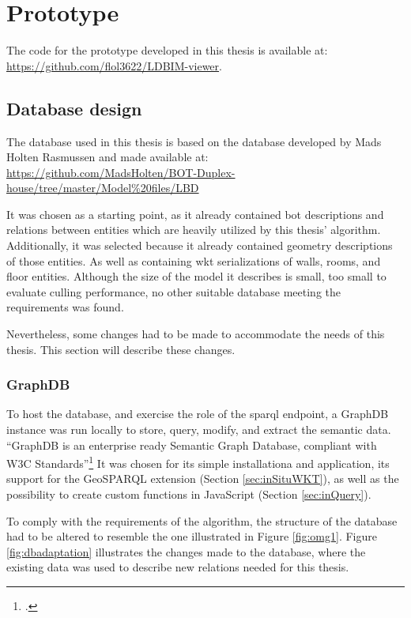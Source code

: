 \chapter{Prototype} \label{ch:prototype}
The code for the prototype developed in this thesis is available at:\\
\url{https://github.com/flol3622/LDBIM-viewer}.

\section{Database design}
The database used in this thesis is based on the database developed by Mads Holten Rasmussen and made available at:\\
\url{https://github.com/MadsHolten/BOT-Duplex-house/tree/master/Model%20files/LBD}

It was chosen as a starting point, as it already contained \ac{bot} descriptions and relations between entities which are heavily utilized by this thesis' algorithm. Additionally, it was selected because it already contained geometry descriptions of those entities. As well as containing \ac{wkt} serializations of walls, rooms, and floor entities. Although the size of the model it describes is small, too small to evaluate culling performance, no other suitable database meeting the requirements was found.

Nevertheless, some changes had to be made to accommodate the needs of this thesis. This section will describe these changes.

\subsection{GraphDB}
To host the database, and exercise the role of the \ac{sparql} endpoint, a GraphDB instance was run locally to store, query, modify, and extract the semantic data. \enquote{GraphDB is an enterprise ready Semantic Graph Database, compliant with W3C Standards}\footcite{graphdb} It was chosen for its simple installationa and application, its support for the GeoSPARQL extension (Section \ref{sec:inSituWKT}), as well as the possibility to create custom functions in JavaScript (Section \ref{sec:inQuery}).

To comply with the requirements of the algorithm, the structure of the database had to be altered to resemble the one illustrated in Figure \ref{fig:omg1}. Figure \ref{fig:dbadaptation} illustrates the changes made to the database, where the existing data was used to describe new relations needed for this thesis.


